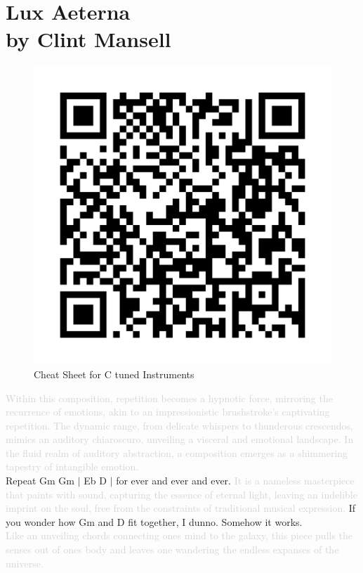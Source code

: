 \chapter[Lux Aeterna]{Lux Aeterna \\[1ex]\large{by Clint Mansell}}
\begin{figure}
\includegraphics[width=1\linewidth]{QR_Codes/QR_LuxAeterna_C.png}\\
Cheat Sheet for C tuned Instruments
\end{figure}

\textcolor{lightgray}{Within this composition, repetition becomes a hypnotic force, mirroring the recurrence of emotions, akin to an impressionistic brushstroke's captivating repetition. The dynamic range, from delicate whispers to thunderous crescendos, mimics an auditory chiaroscuro, unveiling a visceral and emotional landscape.}
\textcolor{lightgray}{In the fluid realm of auditory abstraction, a composition emerges as a shimmering tapestry of intangible emotion.}\\%
Repeat  Gm Gm $|$ Eb  D $|$ for ever and ever and ever.
\textcolor{lightgray}{It is a nameless masterpiece that paints with sound, capturing the essence of eternal light, leaving an indelible imprint on the soul, free from the constraints of traditional musical expression.} If you wonder how Gm and D fit together, I dunno. Somehow it works.\\
\textcolor{lightgray}{Like an unveiling chords connecting ones mind to the galaxy, this piece pulls the senses out of ones body and leaves one wandering the endless expanses of the universe.}

